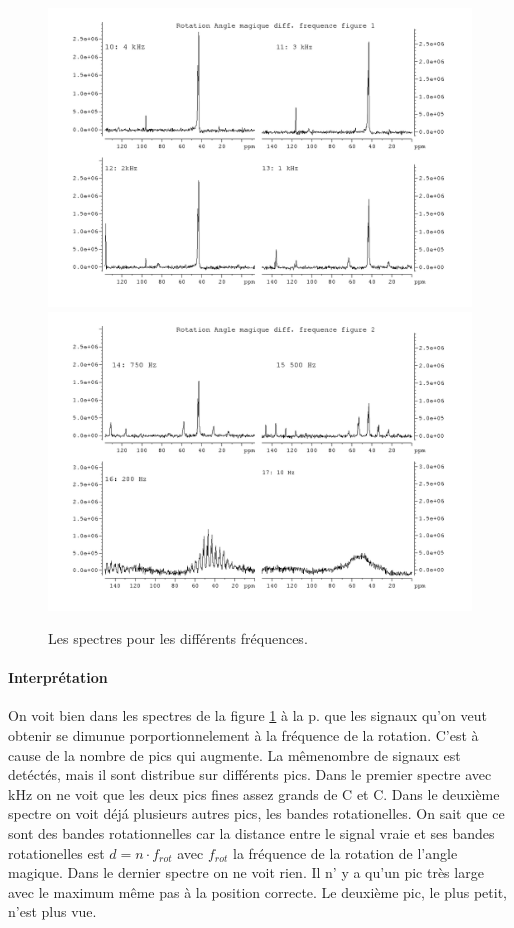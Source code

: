 \documentclass[a4paper,12pt]{scrartcl}
\begin{document}
   \begin{figure}[H]
    \includegraphics[width=\textwidth]{bilder/rotation.png}
    \includegraphics[width=\textwidth]{bilder/rotation2.png}
    \caption{\label{rotation}Les spectres pour les différents fréquences.}
   \end{figure}
   \paragraph{Interprétation}
    On voit bien dans les spectres de la figure \ref{rotation} à la p. \pageref{rotation} que les signaux qu'on veut obtenir se dimunue porportionnelement à la fréquence de la rotation. C'est à cause de la nombre de pics qui augmente. La mêmenombre de signaux est detéctés, mais il sont distribue sur différents pics. Dans le premier spectre avec \unit[4]{kHz} on ne voit que les deux pics fines assez grands de  C et C. Dans le deuxième spectre on voit déjá plusieurs autres pics, les bandes rotationelles. On sait que ce sont des bandes rotationnelles car la distance entre le signal vraie et ses bandes rotationelles est $d=n\cdot f_{rot}$ avec $f_{rot}$ la fréquence de la rotation de l'angle magique. Dans le dernier spectre on ne voit rien. Il n' y a qu'un pic très large avec le maximum même pas à la position correcte. Le deuxième pic, le plus petit, n'est plus vue.
\end{document}
